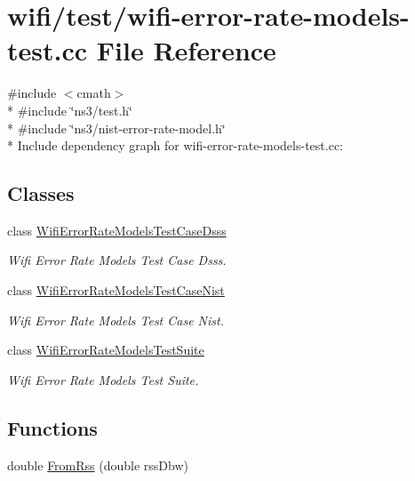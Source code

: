 \hypertarget{wifi-error-rate-models-test_8cc}{}\section{wifi/test/wifi-\/error-\/rate-\/models-\/test.cc File Reference}
\label{wifi-error-rate-models-test_8cc}
{\ttfamily \#include $<$cmath$>$}\\*
{\ttfamily \#include \char`\"{}ns3/test.\+h\char`\"{}}\\*
{\ttfamily \#include \char`\"{}ns3/nist-\/error-\/rate-\/model.\+h\char`\"{}}\\*
Include dependency graph for wifi-\/error-\/rate-\/models-\/test.cc\+:
\subsection*{Classes}
\begin{DoxyCompactItemize}
\item 
class \hyperlink{classWifiErrorRateModelsTestCaseDsss}{Wifi\+Error\+Rate\+Models\+Test\+Case\+Dsss}
\begin{DoxyCompactList}\small\item\em Wifi Error Rate Models Test Case Dsss. \end{DoxyCompactList}\item 
class \hyperlink{classWifiErrorRateModelsTestCaseNist}{Wifi\+Error\+Rate\+Models\+Test\+Case\+Nist}
\begin{DoxyCompactList}\small\item\em Wifi Error Rate Models Test Case Nist. \end{DoxyCompactList}\item 
class \hyperlink{classWifiErrorRateModelsTestSuite}{Wifi\+Error\+Rate\+Models\+Test\+Suite}
\begin{DoxyCompactList}\small\item\em Wifi Error Rate Models Test Suite. \end{DoxyCompactList}\end{DoxyCompactItemize}
\subsection*{Functions}
\begin{DoxyCompactItemize}
\item 
double \hyperlink{wifi-error-rate-models-test_8cc_a04e29db50fb1c1d787cf553ee9453e90}{From\+Rss} (double rss\+Dbw)
\end{DoxyCompactItemize}
